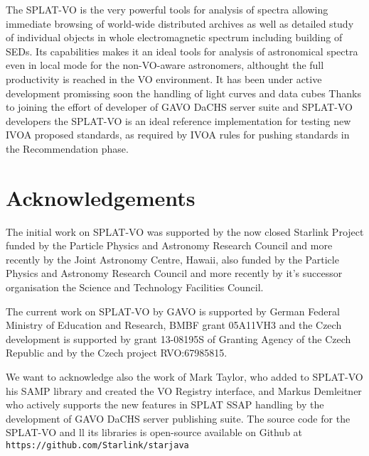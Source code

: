 \documentclass[final,authoryear,5p,times,twocolumn]{elsarticle}
\begin{document}
The SPLAT-VO is the very powerful tools for analysis of spectra allowing
immediate browsing of world-wide distributed archives as well as detailed
study of individual objects in whole electromagnetic spectrum including
building of SEDs. Its capabilities makes it an ideal tools for analysis of
astronomical spectra even in local mode for the non-VO-aware astronomers,
althought the full productivity is reached in the VO environment.  It has been
under active development promissing soon the handling of light curves and data
cubes Thanks to joining the effort of developer of GAVO DaCHS
server suite and SPLAT-VO developers the SPLAT-VO is an ideal reference
implementation for testing new IVOA proposed standards, as required by IVOA
rules for pushing standards in the Recommendation phase.






\section{Acknowledgements} The initial work on SPLAT-VO  was supported by the
now closed Starlink Project funded by the Particle Physics and Astronomy
Research Council and more recently by the Joint Astronomy Centre, Hawaii, also
funded by the Particle Physics and Astronomy Research Council and more
recently by it's successor organisation the Science and Technology Facilities
Council.  

The current work on SPLAT-VO by GAVO is supported by German Federal Ministry of Education
and Research, BMBF grant 05A11VH3 and the Czech development is supported by grant 13-08195S of Granting
Agency of the Czech Republic and  by the Czech project RVO:67985815.

We want to acknowledge also the work of Mark Taylor, who added to SPLAT-VO
his SAMP library and created the VO Registry interface, and Markus Demleitner
who actively supports the new features in SPLAT SSAP handling by the
development of GAVO DaCHS server publishing suite.  The source code for the
SPLAT-VO and ll its libraries is open-source available on Github at {\tt
https://github.com/Starlink/starjava}



\end{document}
